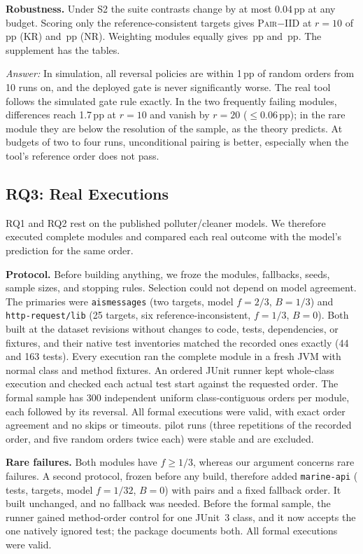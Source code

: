 \documentclass[conference,letterpaper]{IEEEtran}
\theoremstyle{definition}
\newcommand{\pp}{\,pp}
\newcommand{\IIDp}{\textup{\textsc{IID}}}
\newcommand{\PAIRp}{\textup{\textsc{Pair}}}
\begin{document}
\textbf{Robustness.} Under S2 the suite contrasts change by at most 0.04\pp{} at any budget. Scoring only the \NConsistent{} reference-consistent targets gives \PAIRp{}$-$\IIDp{} at $r=10$ of \KRConsPairMinusIidTen\pp{} (KR) and \NRConsPairMinusIidTen\pp{} (NR). Weighting modules equally gives \KRMWPairMinusIidTen\pp{} and \NRMWPairMinusIidTen\pp. The supplement has the tables.

\textit{Answer:} In simulation, all reversal policies are within 1\pp{} of random orders from 10 runs on, and the deployed gate is never significantly worse. The real tool follows the simulated gate rule exactly. In the two frequently failing modules, differences reach 1.7\pp{} at $r=10$ and vanish by $r=20$ ($\le0.06$\pp); in the rare module they are below the resolution of the sample, as the theory predicts. At budgets of two to four runs, unconditional pairing is better, especially when the tool's reference order does not pass.

\subsection{RQ3: Real Executions}\label{sec:execution}
RQ1 and RQ2 rest on the published polluter/cleaner models. We therefore executed complete modules and compared each real outcome with the model's prediction for the same order.

\textbf{Protocol.} Before building anything, we froze the modules, fallbacks, seeds, sample sizes, and stopping rules. Selection could not depend on model agreement. The primaries were \texttt{aismessages} (two targets, model $f=2/3$, $B=1/3$) and \texttt{http-request/lib} (25 targets, six reference-inconsistent, $f=1/3$, $B=0$). Both built at the dataset revisions without changes to code, tests, dependencies, or fixtures, and their native test inventories matched the recorded ones exactly (44 and 163 tests). Every execution ran the complete module in a fresh JVM with normal class and method fixtures. An ordered JUnit runner kept whole-class execution and checked each actual test start against the requested order. The formal sample has 300 independent uniform class-contiguous orders per module, each followed by its reversal. All \ExecRuns{} formal executions were valid, with exact order agreement and no skips or timeouts. \ExecPilotRuns{} pilot runs (three repetitions of the recorded order, and five random orders twice each) were stable and are excluded.

\textbf{Rare failures.} Both modules have $f\ge1/3$, whereas our argument concerns rare failures. A second protocol, frozen before any build, therefore added \texttt{marine-api} (\ExecRareTests{} tests, \ExecRareTargets{} targets, model $f=1/32$, $B=0$) with \ExecRarePairs{} pairs and a fixed fallback order. It built unchanged, and no fallback was needed. Before the formal sample, the runner gained method-order control for one JUnit~3 class, and it now accepts the one natively ignored test; the package documents both. All \ExecRareRuns{} formal executions were valid.
\end{document}
